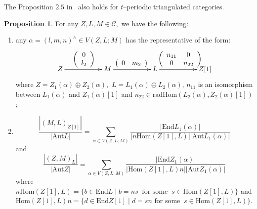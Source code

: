 \documentclass{amsart}
\theoremstyle{definition}
\newtheorem{Prop}[theorem]{Proposition}
\numberwithin{equation}{section}
\begin{document}
The Proposition $2.5$ in~\cite{XX2006} also holds for $t$--periodic
triangulated categories.
\begin{Prop}\label{mainproposition}
For any $Z,L,M\in {{\mathcal{C}}},$ we have the following:
\begin{enumerate}
    \item any $\alpha=(l,m,n)^{\wedge}\in V(Z,L;M)$ has the representative
of the form:
\begin{equation}\nonumber
\xymatrix{Z\ar[rr]^{\left(\begin{array}{c}
  0 \\
  l_2 \\
\end{array}\right)}&& M\ar[rr]^{\left(
                       \begin{array}{cc}
                         0 & m_2 \\
                       \end{array}
                     \right)
}&& L\ar[rr]^{\left(\begin{array}{cc}
  n_{11} & 0 \\
  0 & n_{22} \\
\end{array}\right)}&& Z[1]}
\end{equation}
where $Z=Z_1(\alpha)\oplus Z_2(\alpha),$ $L=L_1(\alpha)\oplus
L_2(\alpha)$, $n_{11}$ is an isomorphism between $L_1(\alpha)$ and
$Z_1(\alpha)[1]$ and $n_{22}\in
\mathrm{radHom}(L_2(\alpha),Z_2(\alpha)[1])$;
    \item $$
\frac{|(M,L)_{Z[1]}|}{|\mathrm{Aut}L|}=\sum_{\alpha\in
V(Z,L;M)}\frac{|\mathrm{End}
L_1(\alpha)|}{|n{\mathrm{Hom}}(Z[1],L)||\mathrm{Aut}L_1(\alpha)|}
$$
and
$$
\frac{|(Z,M)_{L}|}{|\mathrm{Aut}Z|}=\sum_{\alpha\in
V(Z,L;M)}\frac{|\mathrm{End}
Z_1(\alpha)|}{|{\mathrm{Hom}}(Z[1],L)n||\mathrm{Aut}Z_1(\alpha)|}
$$
where $ n{\mathrm{Hom}}(Z[1],L)=\{ b\in \mathrm{End}L \mid  b=ns\ \mbox{ for
some }\ s\in {\mathrm{Hom}}(Z[1],L)\} $ and ${\mathrm{Hom}}(Z[1],L)n=\{d\in
\mathrm{End}Z[1]\mid d=sn  \mbox{ for some }\ s\in {\mathrm{Hom}}(Z[1],L) \}$.
\end{enumerate}
\end{Prop}
\end{document}

